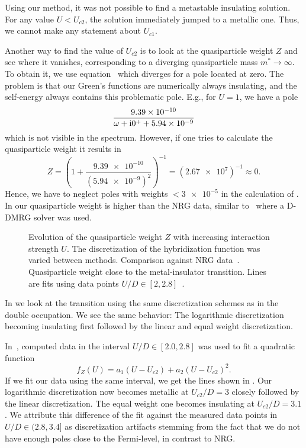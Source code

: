 Using our method,
it was not possible to find a metastable insulating solution.
For any value $U<U_{c2}$, the solution immediately jumped to a metallic one.
Thus, we cannot make any statement about $U_{c1}$.

Another way to find the value of $U_{c2}$ is to look at the quasiparticle weight $Z$ and see
where it vanishes, corresponding to a diverging quasiparticle mass $m^*\to\infty$.
To obtain it,
we use equation~ which diverges for a pole located at zero.
The problem is that our Green's functions are numerically always insulating,
and the self-energy always contains this problematic pole.
E.g., for $U=1$, we have a pole
\begin{equation}
    \frac{\num{9.39e-10}}{\omega + \mathrm{i}0^+ + \num{5.94e-9}}
\end{equation}
which is not visible in the spectrum.
However,
if one tries to calculate the quasiparticle weight it results in
\begin{equation}
    Z
    =
    \left(1 + \frac{\num{9.39e-10}}{(\num{5.94e-9})^2}\right)^{-1}
    =
    (\num{2.67e7})^{-1}
    \approx
    0.
\end{equation}
Hence, we have to neglect poles with weights $<\num{3e-5}$
in the calculation of .
In  our quasiparticle weight is higher than the NRG data,
similar to~\cite{Karski2005, Karski2008} where a D-DMRG solver was used.
\begin{figure}[ht]
    \centering
    
    \caption{
        Evolution of the quasiparticle weight $Z$ with increasing interaction strength $U$.
        The discretization of the hybridization function was varied between methods.
         Comparison against NRG data~\cite{Gauvin-Ndiaye2025}.
        Quasiparticle weight close to the metal-insulator transition.
        Lines are fits using data points $U/D\in [2, 2.8]$~\cite{Karski2008}.
    }%
\end{figure}
In  we look at the transition
using the same discretization schemes as in the double occupation.
We see the same behavior:
The logarithmic discretization becoming
insulating first followed by the linear and equal weight discretization.

In~\cite{Karski2005, Karski2008},
computed data in the interval $U/D\in[2.0,2.8]$
was used to fit a quadratic function
\begin{equation}
    f_Z(U) = a_1(U - U_{c2}) + a_2(U - U_{c2})^2.
\end{equation}
If we fit our data using the same interval,
we get the lines shown in .
Our logarithmic discretization now becomes metallic at $U_{c2}/D=3$
closely followed by the linear discretization.
The equal weight one becomes insulating at $U_{c2}/D=3.1$.
We attribute this difference of the fit against the measured data points
in $U/D\in(2.8,3.4]$ as discretization artifacts %
stemming from the fact that we do not have enough poles close to the Fermi-level,
in contrast to NRG\@.

